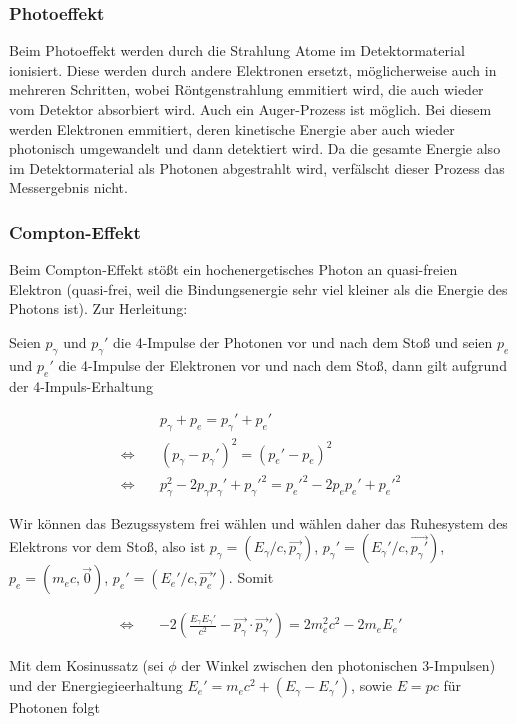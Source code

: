 \documentclass[a4paper,german,12pt,smallheadings]{scrartcl}
\begin{document}
\subsubsection{Photoeffekt}

Beim Photoeffekt werden durch die Strahlung Atome im Detektormaterial
ionisiert. Diese werden durch andere Elektronen ersetzt, möglicherweise auch in
mehreren Schritten, wobei Röntgenstrahlung emmitiert wird, die auch wieder vom
Detektor absorbiert wird. Auch ein Auger-Prozess ist möglich. Bei diesem werden
Elektronen emmitiert, deren kinetische Energie aber auch wieder photonisch
umgewandelt und dann detektiert wird. Da die gesamte Energie also im
Detektormaterial als Photonen abgestrahlt wird, verfälscht dieser Prozess das
Messergebnis nicht.

\subsubsection{Compton-Effekt}

Beim Compton-Effekt stößt ein hochenergetisches Photon an quasi-freien Elektron
(quasi-frei, weil die Bindungsenergie sehr viel kleiner als die Energie des
Photons ist). Zur Herleitung:

Seien $p_\gamma$ und $p_\gamma'$ die 4-Impulse der Photonen vor und nach dem
Stoß und seien $p_e$ und $p_e'$ die 4-Impulse der Elektronen vor und nach dem
Stoß, dann gilt aufgrund der 4-Impuls-Erhaltung

\begin{align}
  &p_\gamma + p_e = p_\gamma' + p_e' \\
  \Leftrightarrow\quad & (p_\gamma - p_\gamma')^2 = (p_e' - p_e)^2 \\
  \Leftrightarrow\quad & p_\gamma^2 - 2p_\gamma p_\gamma' + p_\gamma'^2 = p_e'^2 - 2p_ep_e' + p_e'^2
\end{align}

Wir können das Bezugssystem frei wählen und wählen daher das Ruhesystem des
Elektrons vor dem Stoß, also ist $p_\gamma = (E_\gamma/c, \vec{p_\gamma})$,
$p_\gamma' = (E_\gamma'/c, \vec{p_\gamma'})$, $p_e = (m_e c, \vec{0})$, $p_e' =
(E_e'/c, \vec{p_e}')$. Somit

\begin{align}
  \Leftrightarrow\quad&-2\left(\frac{E_\gamma E_\gamma'}{c^2} - \vec{p_\gamma} \cdot \vec{p_\gamma}'\right) = 2m_e^2c^2 - 2 m_e E_e'
\end{align}

Mit dem Kosinussatz (sei $\phi$ der Winkel zwischen den photonischen
3-Impulsen) und der Energiegieerhaltung $E_e' = m_ec^2 + (E_\gamma -
E_\gamma')$, sowie $E = pc$ für Photonen folgt
\end{document}
